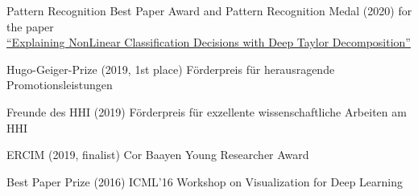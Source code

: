 \documentclass[10pt,a4paper]{article} %
\begin{document}
\inlineheadsection
{Pattern Recognition Best Paper Award and Pattern Recognition Medal (2020)}
{
    for the paper\\
    \href{https://doi.org/10.1016/j.patcog.2016.11.008}{\qquad ``Explaining NonLinear Classification Decisions with Deep Taylor Decomposition''}
}

\vspace{5pt}
\inlineheadsection %
{Hugo-Geiger-Prize (2019, 1st place)}
{
    F\"orderpreis f\"ur herausragende Promotionsleistungen
}

\vspace{5pt}
\inlineheadsection %
{Freunde des HHI (2019)}
{
    F\"orderpreis f\"ur exzellente wissenschaftliche Arbeiten am HHI
}

\vspace{5pt}
\inlineheadsection %
{ERCIM (2019, finalist)}
{
    Cor Baayen Young Researcher Award
}

\vspace{5pt}
\inlineheadsection %
{Best Paper Prize (2016)}
{
    ICML'16 Workshop on Visualization for Deep Learning
}


\spacedhrule{1.6em}{-0.4em} %
\end{document}
